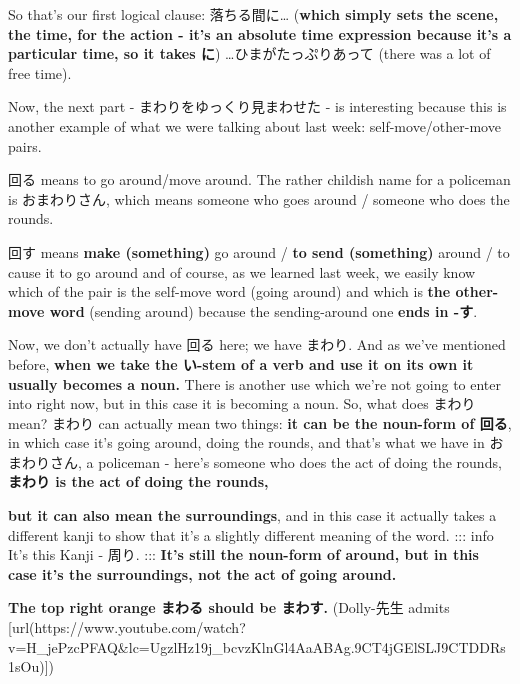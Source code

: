 {}

So that's our first logical clause: 落ちる間に\ldots{} ({\bf which simply sets the scene, the time, for the action - it's an absolute time expression because it's a particular time, so it takes に}) \ldots{}ひまがたっぷりあって (there was a lot of free time).

\thinrule

Now, the next part - まわりをゆっくり見まわせた - is interesting because this is another example of what we were talking about last week: self-move/other-move pairs.

{}

回る means to go around/move around. The rather childish name for a policeman is おまわりさん, which means someone who goes around / someone who does the rounds.

\thinrule

回す means {\bf make (something)} go around / {\bf to send (something)} around / to cause it to go around and of course, as we learned last week, we easily know which of the pair is the self-move word (going around) and which is {\bf the other-move word} (sending around) because the sending-around one {\bf ends in -す}.

\thinrule

Now, we don't actually have 回る here; we have まわり. And as we've mentioned before, {\bf when we take the い-stem of a verb and use it on its own it usually becomes a noun.} There is another use which we're not going to enter into right now, but in this case it is becoming a noun. So, what does まわり mean? まわり can actually mean two things: {\bf it can be the noun-form of 回る}, in which case it's going around, doing the rounds, and that's what we have in おまわりさん, a policeman - here's someone who does the act of doing the rounds, {\bf まわり is the act of doing the rounds,}

\thinrule

{\bf but it can also mean the surroundings}, and in this case it actually takes a different kanji to show that it's a slightly different meaning of the word. ::: info It's this Kanji - 周り. ::: {\bf It's still the noun-form of around, but in this case it's the surroundings, not the act of going around.}

{}

{\bf The top right orange まわる should be まわす.} (Dolly-先生 admits [url(https://www.youtube.com/watch?v=H_jePzcPFAQ&lc=UgzlHz19j_bcvzKlnGl4AaABAg.9CT4jGElSLJ9CTDDRs1sOu)])

